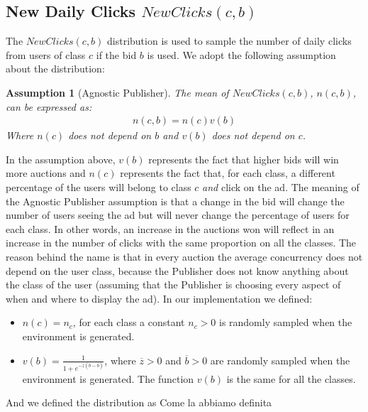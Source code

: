 \documentclass[11pt]{article} %
\newtheorem*{assumption}{Assumption}
\begin{document}
\subsection{New Daily Clicks $NewClicks(c,b)$}
The $NewClicks(c,b)$ distribution is used to sample the number of daily clicks from users of class $c$ if the bid $b$ is used.
\newline
\newline
We adopt the following assumption about the distribution: 
\begin{assumption}[Agnostic Publisher] The mean of $NewClicks(c,b)$, $n(c,b)$, can be expressed as:
\begin{align*}
n(c,b)=n(c)v(b)
\end{align*}
Where $n(c)$ does not depend on $b$ and $v(b)$ does not depend on $c$.
\end{assumption}
In the assumption above, $v(b)$ represents the fact that higher bids will win more auctions and $n(c)$ represents the fact that, for each class, a different percentage of the users will belong to class $c$ \textit{and} click on the ad. The meaning of the Agnostic Publisher assumption is that a change in the bid will change the number of users seeing the ad but will never change the percentage of users for each class. In other words, an increase in the auctions won will reflect in an increase in the number of clicks with the same proportion on all the classes. The reason behind the name is that in every auction the average concurrency does not depend on the user class, because the Publisher does not know anything about the class of the user (assuming that the Publisher is choosing every aspect of when and where to display the ad).
\newline
\newline
In our implementation we defined:
\begin{itemize}
\item $n(c)=n_c$, for each class a constant $n_c > 0$ is randomly sampled when the environment is generated.
\item $v(b)=\frac{1}{1+e^{-\overline z(b-\overline b)}}$, where $\overline z > 0$ and $\overline b > 0$ are randomly sampled when the environment is generated. The function $v(b)$ is the same for all the classes.
\end{itemize}
And we defined the distribution as
{\color{red}Come la abbiamo definita}
\end{document}
